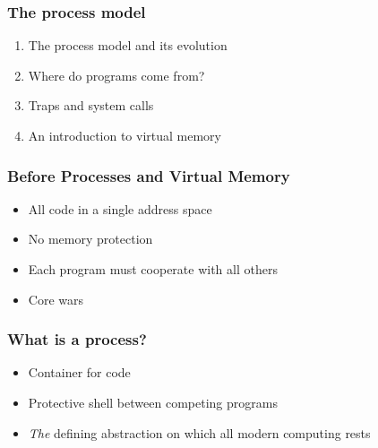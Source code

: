 \documentclass[pdftex]{beamer} %
\begin{document}
\begin{frame}
  \frametitle{The process model}
  \begin{enumerate}
    \item The process model and its evolution
    \item Where do programs come from?
    \item Traps and system calls
    \item An introduction to virtual memory
  \end{enumerate}
\end{frame}

\begin{frame}
  \frametitle{Before Processes and Virtual Memory}
  \begin{itemize}
  \item All code in a single address space
  \item No memory protection
  \item Each program must cooperate with all others
  \item Core wars
  \end{itemize}
\end{frame}

\begin{frame}
  \frametitle{What is a process?}
  \begin{itemize}
  \item Container for code
  \item Protective shell between competing programs
  \item \emph{The} defining abstraction on which all modern computing rests
  \end{itemize}
\end{frame}
\end{document}
